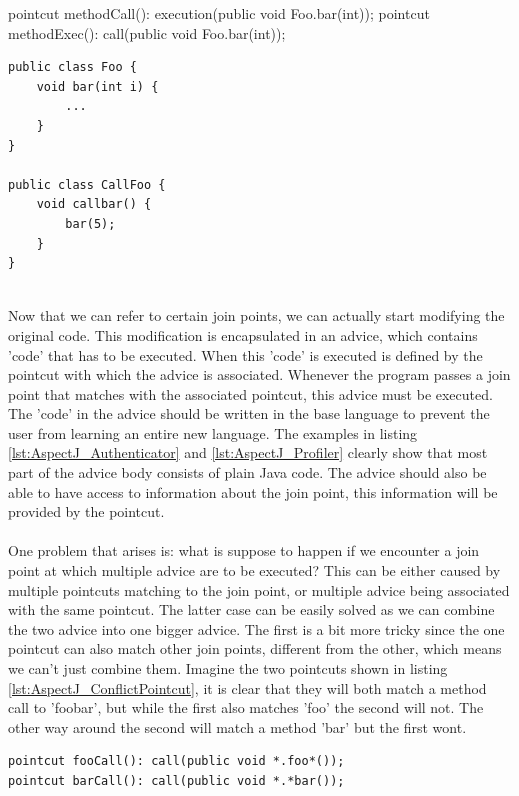 \documentclass[a4paper]{report}
\begin{document}
\begin{minipage}{0.45\textwidth}
\begin{lstlisting}[caption=Two method pointcuts.]
\end{lstlisting}
pointcut methodCall(): execution(public void Foo.bar(int));
pointcut methodExec(): call(public void Foo.bar(int));
\end{minipage}
\begin{minipage}{0.45\textwidth}
\begin{lstlisting}[caption=The join point shadow.]
public class Foo {
	void bar(int i) {
		...
	}
}

public class CallFoo {
	void callbar() {
		bar(5);
	}
}
\end{lstlisting}
\end{minipage}
\\
Now that we can refer to certain join points, we can actually start modifying the original code. This modification is encapsulated in an advice, which contains 'code' that has to be executed. When this 'code' is executed is defined by the pointcut with which the advice is associated. Whenever the program passes a join point that matches with the associated pointcut, this advice must be executed. The 'code' in the advice should be written in the base language to prevent the user from learning an entire new language. The examples in listing \ref{lst:AspectJ_Authenticator} and \ref{lst:AspectJ_Profiler} clearly show that most part of the advice body consists of plain Java code. The advice should also be able to have access to information about the join point, this information will be provided by the pointcut.\\
\\
One problem that arises is: what is suppose to happen if we encounter a join point at which multiple advice are to be executed? This can be either caused by multiple pointcuts matching to the join point, or multiple advice being associated with the same pointcut. The latter case can be easily solved as we can combine the two advice into one bigger advice. The first is a bit more tricky since the one pointcut can also match other join points, different from the other, which means we can't just combine them. Imagine the two pointcuts shown in listing \ref{lst:AspectJ_ConflictPointcut}, it is clear that they will both match a method call to 'foobar', but while the first also matches 'foo' the second will not. The other way around the second will match a method 'bar' but the first wont.
\begin{lstlisting}[caption=Overlapping pointcuts.,label=lst:AspectJ_ConflictPointcut]
pointcut fooCall(): call(public void *.foo*());
pointcut barCall(): call(public void *.*bar());
\end{lstlisting}
\end{document}
